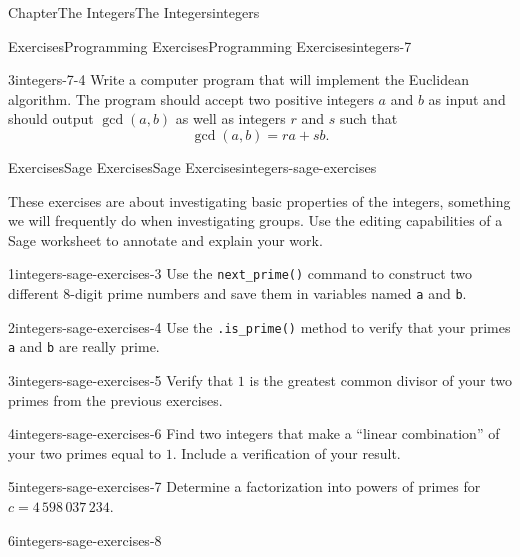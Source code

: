 \documentclass[oneside,10pt,]{book}
\newcommand{\mono}[1]{\texttt{#1}}
\numberwithin{equation}{section}
\begin{document}
\begin{chapterptx}{Chapter}{The Integers}{}{The Integers}{}{}{integers}
\begin{exercises-section}{Exercises}{Programming Exercises}{}{Programming Exercises}{}{}{integers-7}
\begin{divisionexercise}{3}{}{}{integers-7-4}
Write a computer program that will implement the Euclidean algorithm.  The program should accept two positive integers \(a\) and \(b\) as input and should output \(\gcd( a,b)\) as well as integers \(r\) and \(s\) such that%
\begin{equation*}
\gcd( a,b) = ra + sb\text{.}
\end{equation*}
%
\end{divisionexercise}%
\end{exercises-section}
%
%
\typeout{************************************************}
\typeout{************************************************}
%
\begin{exercises-section}{Exercises}{Sage Exercises}{}{Sage Exercises}{}{}{integers-sage-exercises}
\begin{introduction}{}%
These exercises are about investigating basic properties of the integers, something we will frequently do when investigating groups.  Use the editing capabilities of a Sage worksheet to annotate and explain your work.%
\end{introduction}%
\begin{divisionexercise}{1}{}{}{integers-sage-exercises-3}%
Use the \mono{next\_prime()} command to construct two different 8-digit prime numbers and save them in variables named \mono{a} and \mono{b}.%
\end{divisionexercise}%
\begin{divisionexercise}{2}{}{}{integers-sage-exercises-4}%
Use the \mono{.is\_prime()} method to verify that your primes \mono{a} and \mono{b} are really prime.%
\end{divisionexercise}%
\begin{divisionexercise}{3}{}{}{integers-sage-exercises-5}%
Verify that \(1\) is the greatest common divisor of your two primes from the previous exercises.%
\end{divisionexercise}%
\begin{divisionexercise}{4}{}{}{integers-sage-exercises-6}%
Find two integers that make a ``linear combination'' of your two primes equal to \(1\).  Include a verification of your result.%
\end{divisionexercise}%
\begin{divisionexercise}{5}{}{}{integers-sage-exercises-7}%
Determine a factorization into powers of primes for \(c=4\,598\,037\,234\).%
\end{divisionexercise}%
\begin{divisionexercise}{6}{}{}{integers-sage-exercises-8}%

\end{divisionexercise}
\end{exercises-section}
\end{chapterptx}
\end{document}

